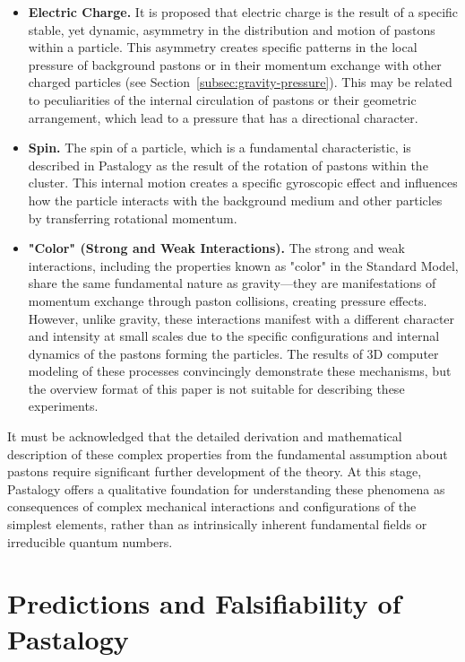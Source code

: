 \documentclass[pdflatex,sn-mathphys-num,referee]{sn-jnl}
\begin{document}
\begin{itemize}
    \item \textbf{Electric Charge.} It is proposed that electric charge is the result of a specific stable, yet dynamic, asymmetry in the distribution and motion of pastons within a particle. This asymmetry creates specific patterns in the local pressure of background pastons or in their momentum exchange with other charged particles (see Section~\ref{subsec:gravity-pressure}). This may be related to peculiarities of the internal circulation of pastons or their geometric arrangement, which lead to a pressure that has a directional character.
    \item \textbf{Spin.} The spin of a particle, which is a fundamental characteristic, is described in Pastalogy as the result of the rotation of pastons within the cluster. This internal motion creates a specific gyroscopic effect and influences how the particle interacts with the background medium and other particles by transferring rotational momentum.
    \item \textbf{"Color" (Strong and Weak Interactions).} The strong and weak interactions, including the properties known as "color" in the Standard Model, share the same fundamental nature as gravity---they are manifestations of momentum exchange through paston collisions, creating pressure effects. However, unlike gravity, these interactions manifest with a different character and intensity at small scales due to the specific configurations and internal dynamics of the pastons forming the particles. The results of 3D computer modeling of these processes convincingly demonstrate these mechanisms, but the overview format of this paper is not suitable for describing these experiments.
\end{itemize}

It must be acknowledged that the detailed derivation and mathematical description of these complex properties from the fundamental assumption about pastons require significant further development of the theory. At this stage, Pastalogy offers a qualitative foundation for understanding these phenomena as consequences of complex mechanical interactions and configurations of the simplest elements, rather than as intrinsically inherent fundamental fields or irreducible quantum numbers.

\section{Predictions and Falsifiability of Pastalogy}\label{sec:predictions}
\end{document}
